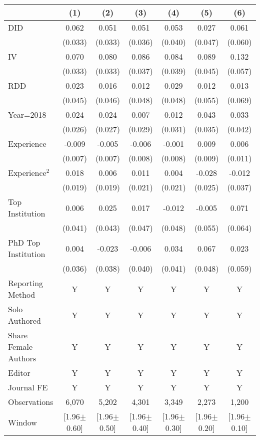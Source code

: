 \begin{tabular}{l*{6}{c}}
\hline\hline
                &\multicolumn{1}{c}{(1)}&\multicolumn{1}{c}{(2)}&\multicolumn{1}{c}{(3)}&\multicolumn{1}{c}{(4)}&\multicolumn{1}{c}{(5)}&\multicolumn{1}{c}{(6)}\\
\hline
DID             &    0.062&    0.051&    0.051&    0.053&    0.027&    0.061\\
                &  (0.033)&  (0.033)&  (0.036)&  (0.040)&  (0.047)&  (0.060)\\
IV              &    0.070&    0.080&    0.086&    0.084&    0.089&    0.132\\
                &  (0.033)&  (0.033)&  (0.037)&  (0.039)&  (0.045)&  (0.057)\\
RDD             &    0.023&    0.016&    0.012&    0.029&    0.012&    0.013\\
                &  (0.045)&  (0.046)&  (0.048)&  (0.048)&  (0.055)&  (0.069)\\
Year=2018       &    0.024&    0.024&    0.007&    0.012&    0.043&    0.033\\
                &  (0.026)&  (0.027)&  (0.029)&  (0.031)&  (0.035)&  (0.042)\\
Experience      &   -0.009&   -0.005&   -0.006&   -0.001&    0.009&    0.006\\
                &  (0.007)&  (0.007)&  (0.008)&  (0.008)&  (0.009)&  (0.011)\\
Experience$^2$  &    0.018&    0.006&    0.011&    0.004&   -0.028&   -0.012\\
                &  (0.019)&  (0.019)&  (0.021)&  (0.021)&  (0.025)&  (0.037)\\
Top Institution &    0.006&    0.025&    0.017&   -0.012&   -0.005&    0.071\\
                &  (0.041)&  (0.043)&  (0.047)&  (0.048)&  (0.055)&  (0.064)\\
PhD Top Institution&    0.004&   -0.023&   -0.006&    0.034&    0.067&    0.023\\
                &  (0.036)&  (0.038)&  (0.040)&  (0.041)&  (0.048)&  (0.059)\\
Reporting Method &        Y&        Y&        Y&        Y&        Y&        Y\\
Solo Authored   &        Y&        Y&        Y&        Y&        Y&        Y\\
Share Female Authors &        Y&        Y&        Y&        Y&        Y&        Y\\
Editor          &        Y&        Y&        Y&        Y&        Y&        Y\\
Journal FE      &        Y&        Y&        Y&        Y&        Y&        Y\\
\hline
Observations    &    6,070&    5,202&    4,301&    3,349&    2,273&    1,200\\
Window          &[1.96$\pm$0.60]&[1.96$\pm$0.50]&[1.96$\pm$0.40]&[1.96$\pm$0.30]&[1.96$\pm$0.20]&[1.96$\pm$0.10]\\
\hline\hline
\end{tabular}
